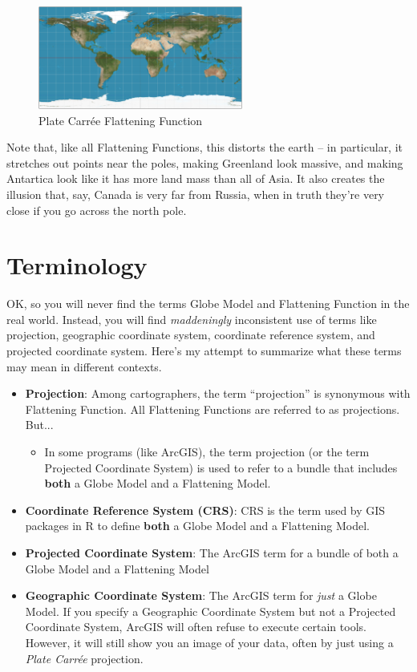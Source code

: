 \documentclass[11pt]{article}
\begin{document}
\begin{figure}
	\centering
	\caption{Plate Carr\'ee Flattening Function}\label{}
	\includegraphics[width=0.6\textwidth]{media/platecaree.jpg}
\end{figure}

Note that, like all Flattening Functions, this distorts the earth -- in particular, it stretches out points near the poles, making Greenland look massive, and making Antartica look like it has more land mass than all of Asia. It also creates the illusion that, say, Canada is very far from Russia, when in truth they're very close if you go across the north pole.

\pagebreak

\section{Terminology}

OK, so you will never find the terms Globe Model and Flattening Function in the real world. Instead, you will find \emph{maddeningly} inconsistent use of terms like projection, geographic coordinate system, coordinate reference system, and projected coordinate system. Here's my attempt to summarize what these terms may mean in different contexts.



\begin{itemize}
	\item  \textbf{Projection}: Among cartographers, the term ``projection'' is synonymous with Flattening Function. All Flattening Functions are referred to as projections. But...
\begin{itemize}
	\item  In some programs (like ArcGIS), the term projection (or the term Projected Coordinate System) is used to refer to a bundle that includes \textbf{both} a Globe Model and a Flattening Model.
\end{itemize}
\item \textbf{Coordinate Reference System (CRS)}: CRS is the term used by GIS packages in R to define \textbf{both} a Globe Model and a Flattening Model.
\item \textbf{Projected Coordinate System}: The ArcGIS term for a bundle of both a Globe Model and a Flattening Model
\item \textbf{Geographic Coordinate System}: The ArcGIS term for \emph{just} a Globe Model. If you specify a Geographic Coordinate System but not a Projected Coordinate System, ArcGIS will often refuse to execute certain tools. However, it will still show you an image of your data, often by just using a \emph{Plate Carr\'ee} projection.
\end{itemize}
\end{document}
